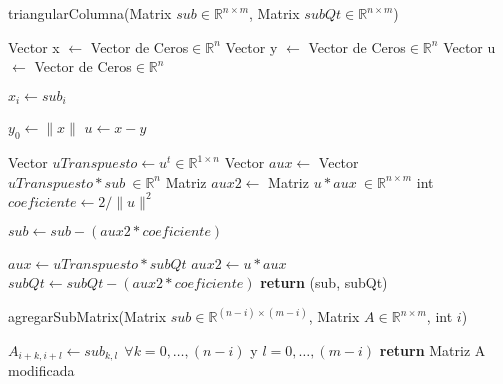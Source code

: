 \begin{algorithm}[H]
\caption{triangularColumna(Matrix $sub \in \mathbb{R}^{n \times m}$, Matrix $subQt \in \mathbb{R}^{n \times m}$)}
\label{pseudo:triangular-columna}
\begin{algorithmic}

\STATE Vector x $\leftarrow$ Vector de Ceros$ \in \mathbb{R}^n$
\STATE Vector y $\leftarrow$ Vector de Ceros$ \in \mathbb{R}^n$
\STATE Vector u $\leftarrow$ Vector de Ceros$ \in \mathbb{R}^n$


  	\STATE $x_i \leftarrow sub_i$
\ENDFOR

\STATE $y_0 \leftarrow \| x \|$
\STATE $u \leftarrow x - y$

\STATE Vector $uTranspuesto \leftarrow u^t \in \mathbb{R}^{1 \times n}$
\STATE Vector $aux \leftarrow$ Vector $uTranspuesto*sub \ \in \mathbb{R}^n$
\STATE Matriz $aux2 \leftarrow$ Matriz $u*aux \ \in \mathbb{R}^{n \times m}$
\STATE int $coeficiente \leftarrow 2/\| u \| ^2$

\STATE $sub \leftarrow sub - (aux2*coeficiente)$

\STATE $aux \leftarrow uTranspuesto * subQt$
\STATE $aux2 \leftarrow u*aux$
\STATE $subQt \leftarrow subQt - (aux2 * coeficiente)$
\STATE \textbf{return} (sub, subQt)

\end{algorithmic}
\end{algorithm}


\begin{algorithm}[H]
\caption{agregarSubMatrix(Matrix $sub \in \mathbb{R}^{(n-i)\times (m-i)}$, Matrix $A \in \mathbb{R}^{n \times m}$, int $i$)}
\label{pseudo:agregar-sub-matrix}
\begin{algorithmic}
\STATE $A_{i+k,i+l} \leftarrow sub_{k,l} \ \ \forall k=0,\ldots,(n-i)$ y $l=0,\ldots,(m-i)$
\STATE \textbf{return} Matriz A modificada
\end{algorithmic}
\end{algorithm}
